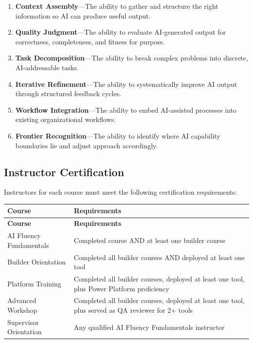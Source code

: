 \documentclass[11pt,letterpaper]{article}
\begin{document}
\begin{enumerate}
  \item \textbf{Context Assembly}---The ability to gather and structure the right information so AI can produce useful output.
  \item \textbf{Quality Judgment}---The ability to evaluate AI-generated output for correctness, completeness, and fitness for purpose.
  \item \textbf{Task Decomposition}---The ability to break complex problems into discrete, AI-addressable tasks.
  \item \textbf{Iterative Refinement}---The ability to systematically improve AI output through structured feedback cycles.
  \item \textbf{Workflow Integration}---The ability to embed AI-assisted processes into existing organizational workflows.
  \item \textbf{Frontier Recognition}---The ability to identify where AI capability boundaries lie and adjust approach accordingly.
\end{enumerate}

\subsection{Instructor Certification}
\label{sec:instructor-certification}

Instructors for each course must meet the following certification requirements:

\begin{longtable}{@{}p{3.5cm}p{10cm}@{}}
\toprule
\textbf{Course} & \textbf{Requirements} \\
\midrule
\endfirsthead
\toprule
\textbf{Course} & \textbf{Requirements} \\
\midrule
\endhead
\bottomrule
\endlastfoot
AI Fluency Fundamentals & Completed course AND at least one builder course \\
\midrule
Builder Orientation & Completed all builder courses AND deployed at least one tool \\
\midrule
Platform Training & Completed all builder courses, deployed at least one tool, plus Power Platform proficiency \\
\midrule
Advanced Workshop & Completed all builder courses, deployed at least one tool, plus served as QA reviewer for 2+ tools \\
\midrule
Supervisor Orientation & Any qualified AI Fluency Fundamentals instructor \\
\end{longtable}
\end{document}
